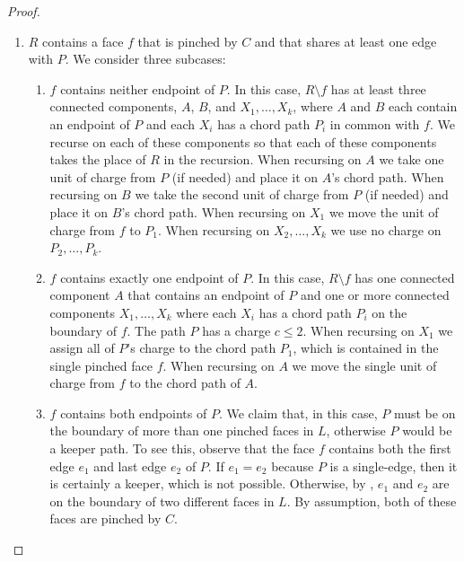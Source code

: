 \documentclass{patmorin}
\begin{document}
\begin{proof}
\begin{enumerate}
     \item $R$ contains a face $f$ that is pinched by $C$ and that shares
     at least one edge with $P$.  We consider three subcases:
     \begin{enumerate}
	\item $f$ contains neither endpoint of $P$. In this case,
	$R\setminus f$ has at least three connected components, $A$, $B$,
	and $X_1,\ldots,X_k$, where $A$ and $B$ each contain an endpoint
	of $P$ and each $X_i$ has a chord path $P_i$ in common
	with $f$.  We recurse on each of these components so that each
	of these components takes the place of $R$ in the recursion. When
	recursing on $A$ we take one unit of charge from $P$ (if needed)
	and place it on $A$'s chord path.  When recursing on $B$ we take
	the second unit of charge from $P$ (if needed) and place it on
	$B$'s chord path.  When recursing on $X_1$ we move the unit of
	charge from $f$ to $P_1$.  When recursing on $X_2,\ldots,X_k$
	we use no charge on $P_2,\ldots,P_k$.

	\item $f$ contains exactly one endpoint of $P$.  In this case,
	$R\setminus f$ has one connected component $A$ that contains
	an endpoint of $P$ and one or more connected components
	$X_1,\ldots,X_k$ where each $X_i$ has a chord path $P_i$ on the
	boundary of $f$.
	The path $P$ has a charge $c\le 2$.  When recursing on $X_1$
	we assign all of $P$'s charge to the chord path $P_1$, which is
	contained in the single pinched face $f$.
	When recursing on $A$ we move the single unit of charge from $f$
	to the chord path of $A$.

        \item $f$ contains both endpoints of $P$.  We claim that,
        in this case, $P$ must be on the boundary of more than one
        pinched faces in $L$, otherwise $P$ would be a keeper path.
        To see this, observe that the face $f$ contains both the first
        edge $e_1$ and last edge $e_2$ of $P$. If $e_1=e_2$ because $P$
        is a single-edge, then it is certainly a keeper, which is not
        possible. Otherwise, by
        , $e_1$ and $e_2$ are on the boundary of
        two different faces in $L$.  By assumption, both of these faces
        are pinched by $C$.


\end{enumerate}
\end{enumerate}
\end{proof}
\end{document}
